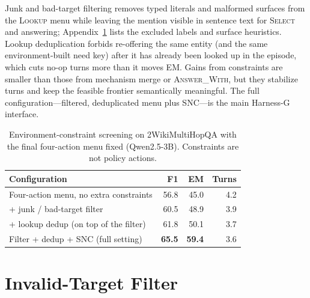 \documentclass[letterpaper]{article} %
\begin{document}
Junk and bad-target filtering removes typed literals and malformed surfaces from the \textsc{Lookup} menu while leaving the mention visible in sentence text for \textsc{Select} and answering; Appendix~\ref{app:filter} lists the excluded labels and surface heuristics.
Lookup deduplication forbids re-offering the same entity (and the same environment-built need key) after it has already been looked up in the episode, which cuts no-op turns more than it moves EM.
Gains from constraints are smaller than those from mechanism merge or \textsc{Answer\_With}, but they stabilize turns and keep the feasible frontier semantically meaningful.
The full configuration---filtered, deduplicated menu plus SNC---is the main Harness-G interface.

\begin{table}[t]
\centering
\small
\setlength{\tabcolsep}{3.5pt}
\renewcommand{\arraystretch}{1.12}
\begin{tabular}{@{}lrrr@{}}
\toprule
Configuration & F1 & EM & Turns \\
\midrule
Four-action menu, no extra constraints
& 56.8 & 45.0 & 4.2 \\
+ junk / bad-target filter
& 60.5 & 48.9 & 3.9 \\
+ lookup dedup (on top of the filter)
& 61.8 & 50.1 & 3.7 \\
\midrule
Filter + dedup + SNC (full setting)
& \textbf{65.5} & \textbf{59.4} & 3.6 \\
\bottomrule
\end{tabular}
\caption{Environment-constraint screening on 2WikiMultiHopQA with the final four-action menu fixed (Qwen2.5-3B). Constraints are not policy actions.}
\label{tab:constraint-screen}
\end{table}

\section{Invalid-Target Filter}
\label{app:filter}
\end{document}
